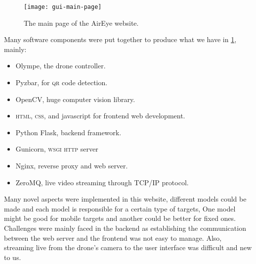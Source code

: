 \documentclass[../main.tex]{subfiles}
\begin{document}
\begin{figure}[tbp]
	\centering
	\texttt{[image: gui-main-page]}
	\caption{The main page of the AirEye website.}
	\label{fig:gui-main-page}
\end{figure}

\noindent Many software components were put together to produce what we have in \cref{fig:gui-main-page}, mainly: 
\begin{itemize}
	\item Olympe, the drone controller. 
	\item Pyzbar, for \textsc{qr} code detection.
	\item OpenCV, huge computer vision library.
	\item \textsc{html}, \textsc{css}, and javascript for frontend web 
	development.
	\item Python Flask, backend framework.
	\item Gunicorn, \textsc{wsgi} \textsc{http} server
	\item Nginx, reverse proxy and web server. 
	\item ZeroMQ, live video streaming through TCP/IP protocol.
\end{itemize}

Many novel aspects were implemented in this website, different models could be 
made and each model is responsible for a certain type of targets, One model 
might be good for mobile targets and another could be better for fixed ones. 
Challenges were mainly faced in the backend as establishing the communication 
between the web server and the frontend was not easy to manage. Also, 
streaming live from the drone's camera to the user interface was 
difficult and new to us.
\end{document}
